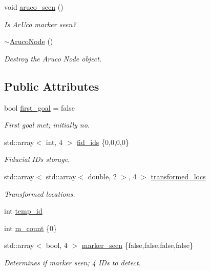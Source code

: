 \begin{DoxyCompactItemize}
void \hyperlink{class_aruco_node_a21fe5af1a16e884424a4065ca6dd608f}{aruco\+\_\+seen} ()
\begin{DoxyCompactList}\small\item\em Is Ar\+Uco marker seen? \end{DoxyCompactList}\item 
\hyperlink{class_aruco_node_a134694163a28530a800198e2c039eb25}{$\sim$\+Aruco\+Node} ()
\begin{DoxyCompactList}\small\item\em Destroy the Aruco Node object. \end{DoxyCompactList}\end{DoxyCompactItemize}
\subsection*{Public Attributes}
\begin{DoxyCompactItemize}
\item 
bool \hyperlink{class_aruco_node_a323a2a97fc30a4e6daf59d9577485569}{first\+\_\+goal} = false
\begin{DoxyCompactList}\small\item\em First goal met; initially no. \end{DoxyCompactList}\item 
std\+::array$<$ int, 4 $>$ \hyperlink{class_aruco_node_aa64bc8aad47d7569e315f5045ecaa7ac}{fid\+\_\+ids} \{0,0,0,0\}
\begin{DoxyCompactList}\small\item\em Fiducial I\+Ds storage. \end{DoxyCompactList}\item 
std\+::array$<$ std\+::array$<$ double, 2 $>$, 4 $>$ \hyperlink{class_aruco_node_ab410bc0b655071ee67e7ba63b4edf256}{transformed\+\_\+locs}
\begin{DoxyCompactList}\small\item\em Transformed locations. \end{DoxyCompactList}\item 
int \hyperlink{class_aruco_node_ac9561321e855855ccc8f643cc139a638}{temp\+\_\+id}
\item 
int \hyperlink{class_aruco_node_a454cdb8d15fa07e7913887a1b2029600}{m\+\_\+count} \{0\}
\item 
std\+::array$<$ bool, 4 $>$ \hyperlink{class_aruco_node_a2e41167c119527f9fbeb937838fc8909}{marker\+\_\+seen} \{false,false,false,false\}
\begin{DoxyCompactList}\small\item\em Determines if marker seen; 4 I\+Ds to detect. \end{DoxyCompactList}\end{DoxyCompactItemize}


